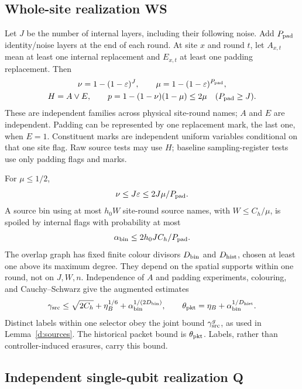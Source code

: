 \subsection{Whole-site realization WS}\label{s:ws-realization}
Let \(J\) be the number of internal layers, including their following
noise. Add \(P_{\rm pad}\) identity/noise layers at the end of each round. At
site \(x\) and round \(t\), let \(A_{x,t}\) mean at least one internal
replacement and \(E_{x,t}\) at least one padding replacement. Then
\begin{equation}\label{eq:macro-rates}
\begin{gathered}
 \nu=1-(1-\varepsilon)^J,\qquad \mu=1-(1-\varepsilon)^{P_{\rm pad}},\\
 H=A\lor E,\qquad p=1-(1-\nu)(1-\mu)\le2\mu\quad(P_{\rm pad}\ge J).
\end{gathered}
\end{equation}
These are independent families across physical
site-round names; \(A\) and \(E\) are independent. Padding can be
represented by one replacement mark, the last one, when \(E=1\).
Constituent marks are independent uniform variables conditional on that
one site flag. Raw source tests may use \(H\); baseline sampling-register tests use
only padding flags and marks.

For \(\mu\le1/2\),
\[
 \nu\le J\varepsilon\le2J\mu/P_{\rm pad}.
\]
A source bin using at most \(h_0W\) site-round source names, with \(W\le C_h/\mu\),
is spoiled by internal flags with probability at most
\begin{equation}\label{eq:overlay}
 \alpha_{\rm bin}\le 2h_0JC_h/P_{\rm pad}.
\end{equation}
The overlap graph has fixed finite colour divisors \(D_{\rm bin}\)
and \(D_{\rm hist}\), chosen at least one above its maximum degree.
They depend on the spatial supports within one round, not on \(J,W,n\).
Independence of \(A\) and padding experiments, colouring, and
Cauchy--Schwarz give the augmented estimates
\begin{equation}\label{eq:gamma}
 \gamma_{\rm src}\le\sqrt{2C_h}+\eta_B^{1/6}
       +\alpha_{\rm bin}^{1/(2D_{\rm bin})},\qquad
 \theta_{\rm pkt}=\eta_B+\alpha_{\rm bin}^{1/D_{\rm hist}}.
\end{equation}
Distinct labels within one selector obey the joint bound \(\gamma_{\rm src}^g\), as used in
Lemma~\ref{d:sources}. The historical packet bound is \(\theta_{\rm pkt}\). Labels,
rather than controller-induced erasures, carry this bound.

\subsection{Independent single-qubit realization Q}\label{s:probe}

